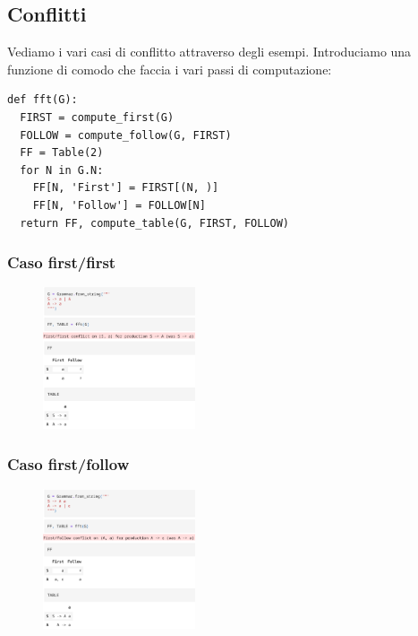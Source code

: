 \subsection{Conflitti}
Vediamo i vari casi di conflitto attraverso degli esempi.
Introduciamo una funzione di comodo che faccia i vari passi di computazione:
\begin{lstlisting}
def fft(G):
  FIRST = compute_first(G)
  FOLLOW = compute_follow(G, FIRST)
  FF = Table(2)
  for N in G.N: 
    FF[N, 'First'] = FIRST[(N, )]
    FF[N, 'Follow'] = FOLLOW[N]
  return FF, compute_table(G, FIRST, FOLLOW)
\end{lstlisting}

\subsubsection{Caso first/first}
\begin{figure}[ht!]
  \centering
  \includegraphics[width=0.4\textwidth]{images/Parsing/first-first.png}
\end{figure}

\subsubsection{Caso first/follow}
\begin{figure}[ht!]
  \centering
  \includegraphics[width=0.4\textwidth]{images/Parsing/first-follow.png}
\end{figure}

